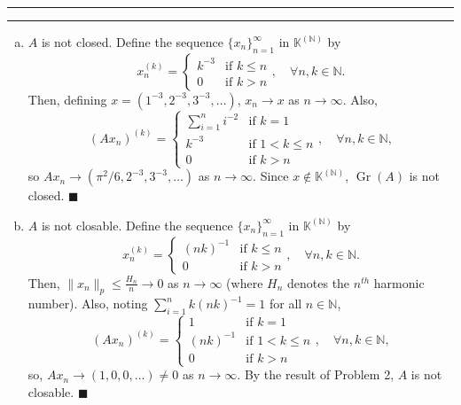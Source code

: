 \documentclass[11pt]{article}
\newcounter{questionCounter}
\newcounter{partCounter}[questionCounter]
\newenvironment{question}[2][\arabic{questionCounter}]{%
    \setcounter{partCounter}{0}%
    \vspace{.25in} \hrule \vspace{0.5em}%
        \noindent{\bf #2}%
    \vspace{0.8em} \hrule \vspace{.10in}%
    \addtocounter{questionCounter}{1}%
}{}
\renewcommand{\qed}{\quad \ensuremath{\blacksquare}}
\newcommand{\Gr}{\operatorname{Gr}}     %
\newcommand{\N}{\mathbb{N}}             %
\newcommand{\K}{\mathbb{K}}             %
\begin{document}
\newpage
\begin{question}{Problem 3}
\begin{enumerate}[(a)]
\item $A$ is not closed. Define the sequence $\{x_n\}_{n = 1}^\infty$ in
$\K^{(\N)}$ by
\[x_n^{(k)} = \left\{
        \begin{array}{ll}
            k^{-3}  & \mbox{if } k \leq n   \\
            0       & \mbox{if } k > n
        \end{array}
    \right., \quad \forall n,k \in \N.
\]
Then, defining $x = (1^{-3},2^{-3},3^{-3},\dots)$, $x_n \to x$ as
$n \to \infty$. Also,
\[(Ax_n)^{(k)} = \left\{
        \begin{array}{ll}
            \sum_{i = 1}^n i^{-2}   & \mbox{if } k = 1          \\
            k^{-3}                  & \mbox{if } 1 < k \leq n   \\
            0                       & \mbox{if } k > n
        \end{array}
    \right., \quad \forall n,k \in \N,
\]
so $Ax_n \to (\pi^2/6,2^{-3},3^{-3},\dots)$ as $n \to \infty$. Since
$x \notin \K^{(\N)}$, $\Gr(A)$ is not closed. \qed

\item $A$ is not closable. Define the sequence $\{x_n\}_{n = 1}^\infty$ in
$\K^{(\N)}$ by
\[x_n^{(k)} = \left\{
        \begin{array}{ll}
            (nk)^{-1}  & \mbox{if } k \leq n   \\
            0       & \mbox{if } k > n
        \end{array}
    \right., \quad \forall n,k \in \N.
\]
Then, $\|x_n\|_p \leq \frac{H_n}{n} \to 0$ as $n \to \infty$ (where $H_n$
denotes the $n^{th}$ harmonic number). Also, noting
$\sum_{i = 1}^n k(nk)^{-1} = 1$ for all $n \in \N$,
\[(Ax_n)^{(k)} = \left\{
        \begin{array}{ll}
            1           & \mbox{if } k = 1          \\
            (nk)^{-1}   & \mbox{if } 1 < k \leq n   \\
            0           & \mbox{if } k > n
        \end{array}
    \right., \quad \forall n,k \in \N,
\]
so, $Ax_n \to (1,0,0,\dots) \neq 0$ as $n \to \infty$. By the result of Problem
2, $A$ is not closable. \qed
\end{enumerate}
\end{question}
\end{document}
